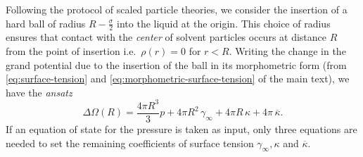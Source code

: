 \documentclass[12pt]{report}
\begin{document}
Following the protocol of scaled particle theories, we consider the insertion of a hard ball of radius $R-\frac{\sigma}{2}$ into the liquid at the origin.
This choice of radius ensures that contact with the \emph{center} of solvent particles occurs at distance $R$ from the point of insertion i.e.\ $\rho(r) = 0$ for $r < R$.
Writing the change in the grand potential due to the insertion of the ball in its morphometric form (from \eqref{eq:surface-tension} and \eqref{eq:morphometric-surface-tension} of the main text), we have the \emph{ansatz}
\begin{equation}\label{eq:morph-ball-solvation}
  \Delta \Omega(R) =
  \frac{4\pi R^3}{3} p +
  4\pi R^2 \, \gamma_\infty +
  4\pi R \, \kappa +
  4 \pi \, \overline{\kappa}.
\end{equation}
If an equation of state for the pressure is taken as input, only three equations are needed to set the remaining coefficients of surface tension $\gamma_\infty, \kappa$ and $\overline{\kappa}$.
\end{document}
